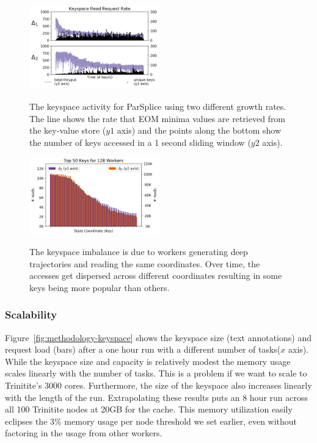 \begin{figure}[t]
  \noindent\includegraphics[width=0.5\textwidth]{figures/motivation-regimes.png}\\
  \caption{The keyspace activity for ParSplice using two different growth
rates.  The line shows the rate that EOM minima values are retrieved from the
key-value store (\(y1\) axis) and the points along the bottom show the number
of keys accessed in a 1 second sliding window (\(y2\) axis).
\label{fig:motivation-regimes}}
\end{figure}

\begin{figure}[t]
  \noindent\includegraphics[width=0.5\textwidth]{figures/methodology-keys.png}\\
  \caption{The keyspace imbalance is due to workers generating deep
  trajectories and reading the same coordinates. Over time, the accesses get
  dispersed across different coordinates resulting in some keys being more
  popular than others.\label{fig:methodology-keys}}
\end{figure}

\subsubsection*{Scalability} Figure~\ref{fig:methodology-keyspace} shows the
keyspace size (text annotations) and request load (bars) after a one hour run
with a different number of tasks(\(x\) axis). While the keyspace size and
capacity is relatively modest the memory usage scales linearly with the number
of tasks. This is a problem if we want to scale to Trinitite's 3000 cores.
Furthermore, the size of the keyspace also increases linearly with the length
of the run.  Extrapolating these results puts an 8 hour run across all 100
Trinitite nodes at 20GB for the cache.  This memory utilization easily eclipses
the 3\% memory usage per node threshold we set earlier, even without factoring
in the usage from other workers.

